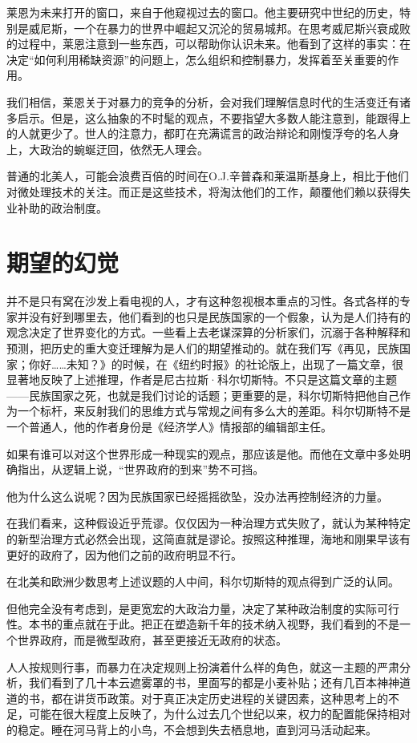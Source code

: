 莱恩为未来打开的窗口，来自于他窥视过去的窗口。他主要研究中世纪的历史，特别是威尼斯，一个在暴力的世界中崛起又沉沦的贸易城邦。在思考威尼斯兴衰成败的过程中，莱恩注意到一些东西，可以帮助你认识未来。他看到了这样的事实：在决定“如何利用稀缺资源”的问题上，怎么组织和控制暴力，发挥着至关重要的作用。


我们相信，莱恩关于对暴力的竞争的分析，会对我们理解信息时代的生活变迁有诸多启示。但是，这么抽象的不时髦的观点，不要指望大多数人能注意到，能跟得上的人就更少了。世人的注意力，都盯在充满谎言的政治辩论和刚愎浮夸的名人身上，大政治的蜿蜒迂回，依然无人理会。


普通的北美人，可能会浪费百倍的时间在O.J.辛普森和莱温斯基身上，相比于他们对微处理技术的关注。而正是这些技术，将淘汰他们的工作，颠覆他们赖以获得失业补助的政治制度。


\section{期望的幻觉}
并不是只有窝在沙发上看电视的人，才有这种忽视根本重点的习性。各式各样的专家并没有好到哪里去，他们看到的也只是民族国家的一个假象，认为是人们持有的观念决定了世界变化的方式。一些看上去老谋深算的分析家们，沉溺于各种解释和预测，把历史的重大变迁理解为是人们的期望推动的。就在我们写《再见，民族国家；你好……未知？》的时候，在《纽约时报》的社论版上，出现了一篇文章，很显著地反映了上述推理，作者是尼古拉斯·科尔切斯特。不只是这篇文章的主题——民族国家之死，也就是我们讨论的话题；更重要的是，科尔切斯特把他自己作为一个标杆，来反射我们的思维方式与常规之间有多么大的差距。科尔切斯特不是一个普通人，他的作者身份是《经济学人》情报部的编辑部主任。


如果有谁可以对这个世界形成一种现实的观点，那应该是他。而他在文章中多处明确指出，从逻辑上说，“世界政府的到来”势不可挡。


他为什么这么说呢？因为民族国家已经摇摇欲坠，没办法再控制经济的力量。


在我们看来，这种假设近乎荒谬。仅仅因为一种治理方式失败了，就认为某种特定的新型治理方式必然会出现，这简直就是谬论。按照这种推理，海地和刚果早该有更好的政府了，因为他们之前的政府明显不行。


在北美和欧洲少数思考上述议题的人中间，科尔切斯特的观点得到广泛的认同。


但他完全没有考虑到，是更宽宏的大政治力量，决定了某种政治制度的实际可行性。本书的重点就在于此。把正在塑造新千年的技术纳入视野，我们看到的不是一个世界政府，而是微型政府，甚至更接近无政府的状态。


人人按规则行事，而暴力在决定规则上扮演着什么样的角色，就这一主题的严肃分析，我们看到了几十本云遮雾罩的书，里面写的都是小麦补贴；还有几百本神神道道的书，都在讲货币政策。对于真正决定历史进程的关键因素，这种思考上的不足，可能在很大程度上反映了，为什么过去几个世纪以来，权力的配置能保持相对的稳定。睡在河马背上的小鸟，不会想到失去栖息地，直到河马活动起来。



